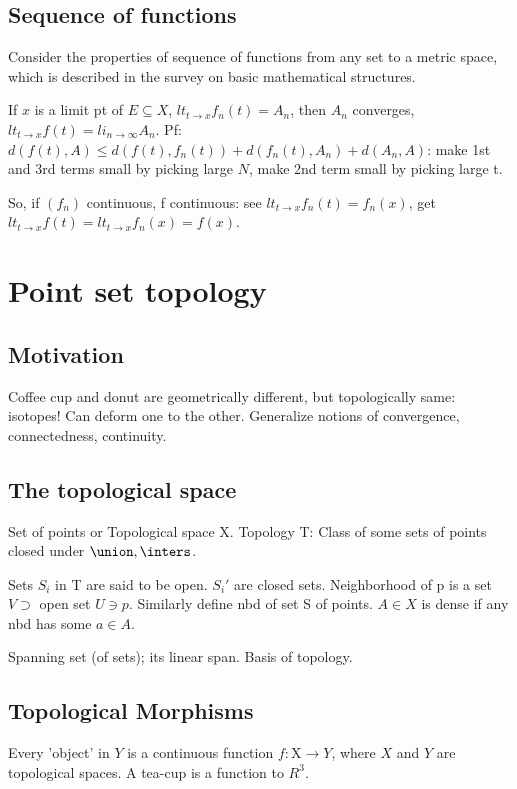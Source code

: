\documentclass[oneside, article]{memoir}
\begin{document}
\section{Sequence of functions }
Consider the properties of sequence of functions from any set to a metric space, which is described in the survey on basic mathematical structures.

If $x$ is a limit pt of $E \subseteq X$, $lt_{t \to x}f_{n}(t) = A_{n}$, then $A_{n}$ converges, $lt_{t \to x} f(t) = li_{n \to \infty} A_{n}$. Pf: $d(f(t), A) \leq d(f(t), f_{n}(t)) + d(f_{n}(t), A_{n}) + d(A_{n}, A)$: make 1st and 3rd terms small by picking large $N$, make 2nd term small by picking large t.

So, if $(f_{n})$ continuous, f continuous: see $lt_{t \to x}f_{n}(t) = f_{n}(x)$, get $lt_{t \to x} f(t) = lt_{t \to x} f_{n}(x) = f(x)$.

\chapter{Point set topology}
\section{Motivation}
Coffee cup and donut are geometrically different, but topologically same: isotopes! Can deform one to the other. Generalize notions of convergence, connectedness, continuity.

\section{The topological space}
Set of points or Topological space X. Topology T: Class of some sets of points closed under $\union, \inters$.

Sets $S_{i}$ in T are said to be open. $S_{i}'$ are closed sets. Neighborhood of p is a set $V \supset$ open set $U \ni p$. Similarly define nbd of set S of points. $A \in X$ is dense if any nbd has some $a\in A$.

Spanning set (of sets); its linear span. Basis of topology.

\section{Topological Morphisms}
Every 'object' in $Y$ is a continuous function $f: $X$ \to Y$, where $X$ and $Y$ are topological spaces. A tea-cup is a function to $R^{3}$.
\end{document}
